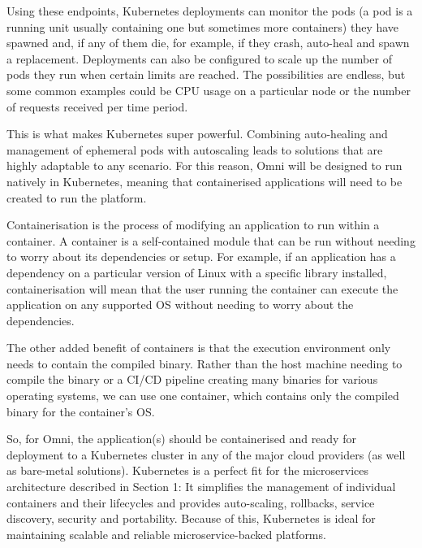 Using these endpoints, Kubernetes deployments can monitor the pods (a pod is a running unit usually containing one but sometimes more containers) they have spawned and, if any of them die, for example, if they crash, auto-heal and spawn a replacement.
Deployments can also be configured to scale up the number of pods they run when certain limits are reached. The possibilities are endless, but some common examples could be CPU usage on a particular node or the number of requests received per time period.

This is what makes Kubernetes super powerful. Combining auto-healing and management of ephemeral pods with autoscaling leads to solutions that are highly adaptable to any scenario.
For this reason, Omni will be designed to run natively in Kubernetes, meaning that containerised applications will need to be created to run the platform.

Containerisation is the process of modifying an application to run within a container. A container is a self-contained module that can be run without needing to worry about its dependencies or setup. For example, if an application has a dependency on a particular version of Linux with a specific library installed, containerisation will mean that the user running the container can execute the application on any supported OS without needing to worry about the dependencies.

The other added benefit of containers is that the execution environment only needs to contain the compiled binary. Rather than the host machine needing to compile the binary or a CI/CD pipeline creating many binaries for various operating systems, we can use one container, which contains only the compiled binary for the container's OS.

So, for Omni, the application(s) should be containerised and ready for deployment to a Kubernetes cluster in any of the major cloud providers (as well as bare-metal solutions).
Kubernetes is a perfect fit for the microservices architecture described in Section 1: It simplifies the management of individual containers and their lifecycles and provides auto-scaling, rollbacks, service discovery, security and portability. Because of this, Kubernetes is ideal for maintaining scalable and reliable microservice-backed platforms.

